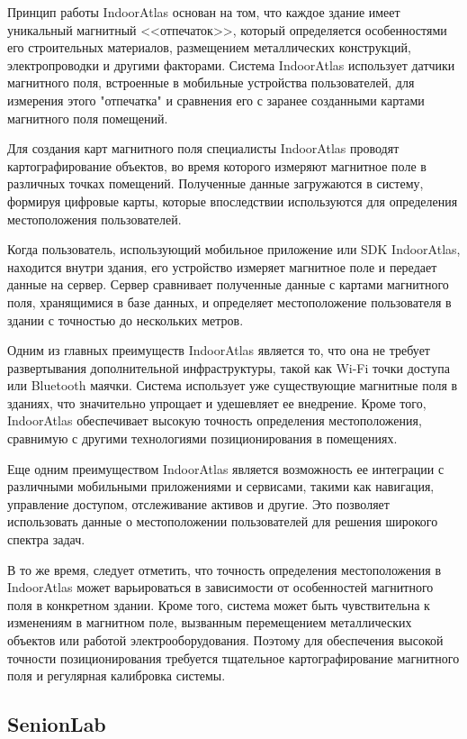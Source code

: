 Принцип работы IndoorAtlas основан на том, что каждое здание имеет уникальный магнитный <<отпечаток>>, который определяется особенностями его строительных материалов, размещением металлических конструкций, электропроводки и другими факторами. Система IndoorAtlas использует датчики магнитного поля, встроенные в мобильные устройства пользователей, для измерения этого "отпечатка" и сравнения его с заранее созданными картами магнитного поля помещений.

Для создания карт магнитного поля специалисты IndoorAtlas проводят картографирование объектов, во время которого измеряют магнитное поле в различных точках помещений. Полученные данные загружаются в систему, формируя цифровые карты, которые впоследствии используются для определения местоположения пользователей.

Когда пользователь, использующий мобильное приложение или SDK IndoorAtlas, находится внутри здания, его устройство измеряет магнитное поле и передает данные на сервер. Сервер сравнивает полученные данные с картами магнитного поля, хранящимися в базе данных, и определяет местоположение пользователя в здании с точностью до нескольких метров.

Одним из главных преимуществ IndoorAtlas является то, что она не требует развертывания дополнительной инфраструктуры, такой как Wi-Fi точки доступа или Bluetooth маячки. Система использует уже существующие магнитные поля в зданиях, что значительно упрощает и удешевляет ее внедрение. Кроме того, IndoorAtlas обеспечивает высокую точность определения местоположения, сравнимую с другими технологиями позиционирования в помещениях.

Еще одним преимуществом IndoorAtlas является возможность ее интеграции с различными мобильными приложениями и сервисами, такими как навигация, управление доступом, отслеживание активов и другие. Это позволяет использовать данные о местоположении пользователей для решения широкого спектра задач.

В то же время, следует отметить, что точность определения местоположения в IndoorAtlas может варьироваться в зависимости от особенностей магнитного поля в конкретном здании. Кроме того, система может быть чувствительна к изменениям в магнитном поле, вызванным перемещением металлических объектов или работой электрооборудования. Поэтому для обеспечения высокой точности позиционирования требуется тщательное картографирование магнитного поля и регулярная калибровка системы.

\subsection{SenionLab}

